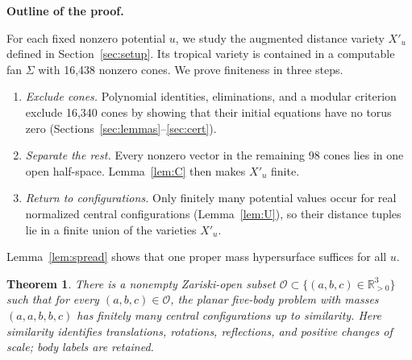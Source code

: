 \documentclass[11pt]{amsart}
\newcommand{\topic}[1]{\par\addvspace{1.4ex}\noindent\textbf{#1}\par\nobreak\smallskip\noindent}
\newtheorem{theorem}{Theorem}\newtheorem{lemma}[theorem]{Lemma}\newtheorem{proposition}[theorem]{Proposition}
\theoremstyle{definition}\newtheorem{definition}[theorem]{Definition}\theoremstyle{remark}\newtheorem{remark}[theorem]{Remark}
\begin{document}
\topic{Outline of the proof.} For each fixed nonzero potential $u$, we study the augmented distance variety $X'_u$ defined in Section~\ref{sec:setup}. Its tropical variety is contained in a computable fan $\Sigma$ with 16,438 nonzero cones. We prove finiteness in three steps.
\begin{enumerate}
\item \emph{Exclude cones.} Polynomial identities, eliminations, and a modular criterion exclude 16,340 cones by showing that their initial equations have no torus zero (Sections~\ref{sec:lemmas}--\ref{sec:cert}).
\item \emph{Separate the rest.} Every nonzero vector in the remaining 98 cones lies in one open half-space. Lemma~\ref{lem:C} then makes $X'_u$ finite.
\item \emph{Return to configurations.} Only finitely many potential values occur for real normalized central configurations (Lemma~\ref{lem:U}), so their distance tuples lie in a finite union of the varieties $X'_u$.
\end{enumerate}
Lemma~\ref{lem:spread} shows that one proper mass hypersurface suffices for all $u$.

\begin{theorem}\label{thm:main}
There is a nonempty Zariski-open subset $\mathcal O\subset\{(a,b,c)\in\mathbb{R}_{>0}^3\}$ such that for every $(a,b,c)\in\mathcal O$, the planar
five-body problem with masses $(a,a,b,b,c)$ has finitely many central configurations up to similarity. Here similarity identifies translations, rotations, reflections, and positive changes of scale; body labels are retained.
\end{theorem}


\end{document}
